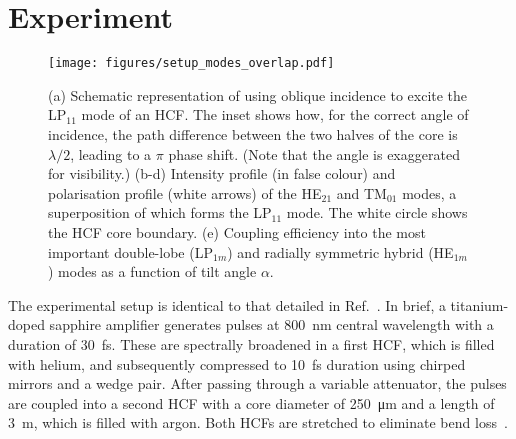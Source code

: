 \documentclass[amsmath, preprint, floatfix]{revtex4-2}
\begin{document}
\section{Experiment}
\begin{figure}
    \texttt{[image: figures/setup\_modes\_overlap.pdf]}
    \caption{(a) Schematic representation of using oblique incidence to excite the LP$_{11}$ mode of an HCF. The inset shows how, for the correct angle of incidence, the path difference between the two halves of the core is $\lambda/2$, leading to a $\pi$ phase shift. (Note that the angle is exaggerated for visibility.) (b-d) Intensity profile (in false colour) and polarisation profile (white arrows) of the HE$_{21}$ and TM$_{01}$ modes, a superposition of which forms the LP$_{11}$ mode. The white circle shows the HCF core boundary. (e) Coupling efficiency into the most important double-lobe (LP$_{1m}$) and radially symmetric hybrid (HE$_{1m}$) modes as a function of tilt angle $\alpha$.}
    \label{fig:setup}
\end{figure}
The experimental setup is identical to that detailed in Ref.~\cite{travers_high-energy_2019}. In brief, a titanium-doped sapphire amplifier generates pulses at \SI{800}{\nm} central wavelength with a duration of \SI{30}{\fs}. These are spectrally broadened in a first HCF, which is filled with helium, and subsequently compressed to \SI{10}{\fs} duration using chirped mirrors and a wedge pair. After passing through a variable attenuator, the pulses are coupled into a second HCF with a core diameter of \SI{250}{\micro\meter} and a length of \SI{3}{\metre}, which is filled with argon. Both HCFs are stretched to eliminate bend loss~\cite{nagy_flexible_2008}.
\end{document}
